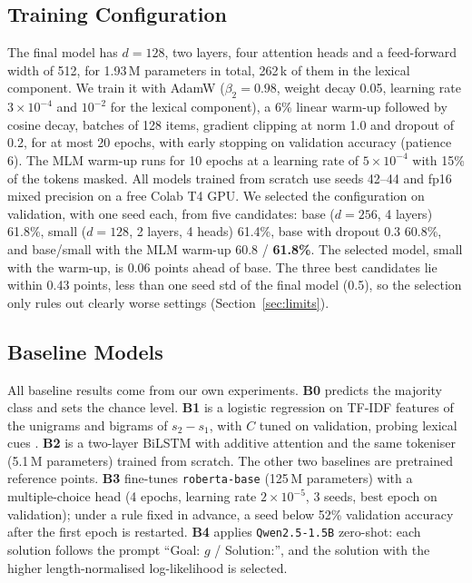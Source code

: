 \documentclass[11pt]{article}
\begin{document}
\subsection{Training Configuration}
The final model has $d{=}128$, two layers, four attention heads and a feed-forward width of 512, for 1.93\,M parameters in total, 262\,k of them in the lexical component. We train it with AdamW \cite{loshchilov2019decoupled} ($\beta_2{=}0.98$, weight decay 0.05, learning rate $3{\times}10^{-4}$ and $10^{-2}$ for the lexical component), a 6\% linear warm-up followed by cosine decay, batches of 128 items, gradient clipping at norm 1.0 and dropout of 0.2, for at most 20 epochs, with early stopping on validation accuracy (patience 6). The MLM warm-up runs for 10 epochs at a learning rate of $5{\times}10^{-4}$ with 15\% of the tokens masked. All models trained from scratch use seeds 42--44 and fp16 mixed precision on a free Colab T4 GPU. We selected the configuration on validation, with one seed each, from five candidates: base ($d{=}256$, 4 layers) 61.8\%, small ($d{=}128$, 2 layers, 4 heads) 61.4\%, base with dropout 0.3 60.8\%, and base/small with the MLM warm-up 60.8 / \textbf{61.8\%}. The selected model, small with the warm-up, is 0.06 points ahead of base. The three best candidates lie within 0.43 points, less than one seed std of the final model (0.5), so the selection only rules out clearly worse settings (Section~\ref{sec:limits}).

\subsection{Baseline Models}
All baseline results come from our own experiments. \textbf{B0} predicts the majority class and sets the chance level. \textbf{B1} is a logistic regression on TF-IDF features of the unigrams and bigrams of $s_2 - s_1$, with $C$ tuned on validation, probing lexical cues \cite{gururangan2018annotation}. \textbf{B2} is a two-layer BiLSTM with additive attention and the same tokeniser (5.1\,M parameters) trained from scratch. The other two baselines are pretrained reference points. \textbf{B3} fine-tunes \texttt{roberta-base} \cite{liu2019roberta} (125\,M parameters) with a multiple-choice head (4 epochs, learning rate $2{\times}10^{-5}$, 3 seeds, best epoch on validation); under a rule fixed in advance, a seed below 52\% validation accuracy after the first epoch is restarted. \textbf{B4} applies \texttt{Qwen2.5-1.5B} \cite{qwen2025qwen25} zero-shot: each solution follows the prompt ``Goal: $g$ / Solution:'', and the solution with the higher length-normalised log-likelihood is selected.
\end{document}
